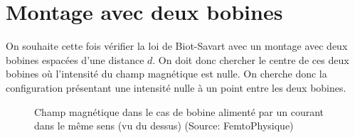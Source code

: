 \documentclass[12pt]{article}
\begin{document}
\newpage
\section{Montage avec deux bobines}
On souhaite cette fois vérifier la loi de Biot-Savart avec un montage avec deux bobines espacées d'une distance $d$. On doit donc chercher le centre de ces deux bobines où 
l'intensité du champ magnétique est nulle. On cherche donc la configuration présentant une intensité nulle à un point entre les deux bobines.

\begin{figure}[h!]
    \centering
    \quad \quad
    \caption{Champ magnétique dans le cas de bobine alimenté par un courant dans le même sens (vu du dessus) (Source: FemtoPhysique)}
\end{figure}
\end{document}
